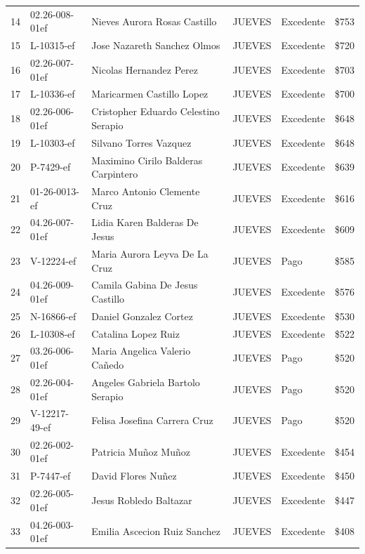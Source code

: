 \documentclass[11pt,a4paper]{article}
\newcommand{\money}[1]{\$\num{#1}}
\begin{document}
\begin{center}
\begin{longtable}{rlp{5.5cm}llr}
14 & 02.26-008-01ef & Nieves Aurora Rosas Castillo & JUEVES & Excedente & \money{753} \\
15 & L-10315-ef & Jose Nazareth Sanchez Olmos & JUEVES & Excedente & \money{720} \\
16 & 02.26-007-01ef & Nicolas Hernandez Perez & JUEVES & Excedente & \money{703} \\
17 & L-10336-ef & Maricarmen Castillo Lopez & JUEVES & Excedente & \money{700} \\
18 & 02.26-006-01ef & Cristopher Eduardo Celestino Serapio & JUEVES & Excedente & \money{648} \\
19 & L-10303-ef & Silvano Torres Vazquez & JUEVES & Excedente & \money{648} \\
20 & P-7429-ef & Maximino Cirilo Balderas Carpintero & JUEVES & Excedente & \money{639} \\
21 & 01-26-0013-ef & Marco Antonio Clemente Cruz & JUEVES & Excedente & \money{616} \\
22 & 04.26-007-01ef & Lidia Karen Balderas De Jesus & JUEVES & Excedente & \money{609} \\
23 & V-12224-ef & Maria Aurora Leyva De La Cruz & JUEVES & Pago & \money{585} \\
24 & 04.26-009-01ef & Camila Gabina De Jesus Castillo & JUEVES & Excedente & \money{576} \\
25 & N-16866-ef & Daniel Gonzalez Cortez & JUEVES & Excedente & \money{530} \\
26 & L-10308-ef & Catalina Lopez Ruiz & JUEVES & Excedente & \money{522} \\
27 & 03.26-006-01ef & Maria Angelica Valerio Cañedo & JUEVES & Pago & \money{520} \\
28 & 02.26-004-01ef & Angeles Gabriela Bartolo Serapio & JUEVES & Pago & \money{520} \\
29 & V-12217-49-ef & Felisa Josefina Carrera Cruz & JUEVES & Pago & \money{520} \\
30 & 02.26-002-01ef & Patricia Muñoz Muñoz & JUEVES & Excedente & \money{454} \\
31 & P-7447-ef & David Flores Nuñez & JUEVES & Excedente & \money{450} \\
32 & 02.26-005-01ef & Jesus Robledo Baltazar & JUEVES & Excedente & \money{447} \\
33 & 04.26-003-01ef & Emilia Ascecion Ruiz Sanchez & JUEVES & Excedente & \money{408} \\

\bottomrule
\end{longtable}
\end{center}
\end{document}
